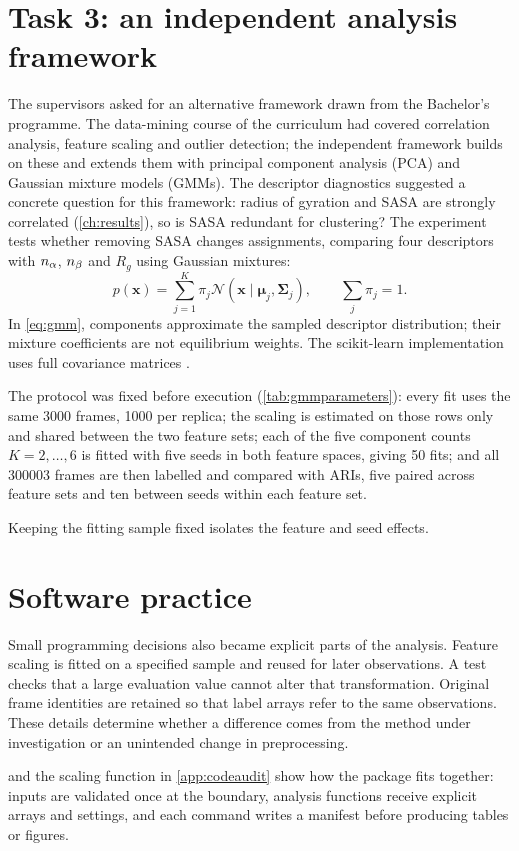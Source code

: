 \section{Task 3: an independent analysis framework}
\label{sec:task3}
The supervisors asked for an alternative framework drawn from the Bachelor's programme. The data-mining course of the curriculum had covered correlation analysis, feature scaling and outlier detection; the independent framework builds on these and extends them with principal component analysis (PCA) and Gaussian mixture models (GMMs). The descriptor diagnostics suggested a concrete question for this framework: radius of gyration and SASA are strongly correlated (\cref{ch:results}), so is SASA redundant for clustering? The experiment tests whether removing SASA changes assignments, comparing four descriptors with $n_{\alpha}$, $n_{\beta}$ and $R_g$ using Gaussian mixtures:
\begin{equation}
p(\mathbf{x})=\sum_{j=1}^{K}\pi_j\mathcal{N}(\mathbf{x}\mid\symbf{\mu}_j,\symbf{\Sigma}_j),\qquad \sum_j\pi_j=1.
\label{eq:gmm}
\end{equation}
In \cref{eq:gmm}, components approximate the sampled descriptor distribution; their mixture coefficients are not equilibrium weights. The scikit-learn implementation uses full covariance matrices \autocite{pedregosa2011}.

The protocol was fixed before execution (\cref{tab:gmmparameters}): every fit uses the same \num{3000} frames, \num{1000} per replica; the scaling is estimated on those rows only and shared between the two feature sets; each of the five component counts $K=2,\ldots,6$ is fitted with five seeds in both feature spaces, giving 50 fits; and all \num{300003} frames are then labelled and compared with ARIs, five paired across feature sets and ten between seeds within each feature set.

Keeping the fitting sample fixed isolates the feature and seed effects.

\section{Software practice}
\label{sec:software}
Small programming decisions also became explicit parts of the analysis. Feature scaling is fitted on a specified sample and reused for later observations. A test checks that a large evaluation value cannot alter that transformation. Original frame identities are retained so that label arrays refer to the same observations. These details determine whether a difference comes from the method under investigation or an unintended change in preprocessing.

 and the scaling function in \cref{app:codeaudit} show how the package fits together: inputs are validated once at the boundary, analysis functions receive explicit arrays and settings, and each command writes a manifest before producing tables or figures.



